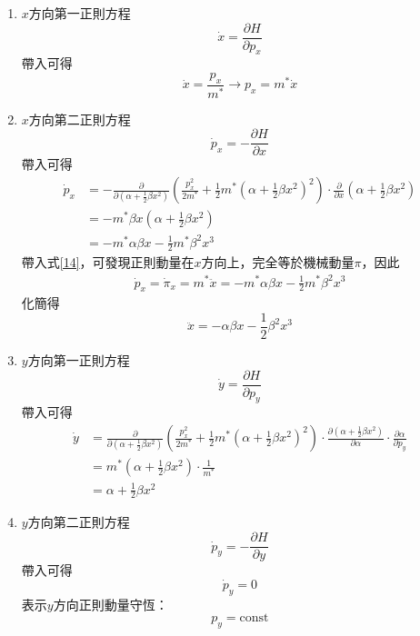 \documentclass[12pt]{article}
\begin{document}
\begin{enumerate}
    \item $x$方向第一正則方程
\begin{equation*}
    \dot{x}=\frac{\partial H}{\partial p_x}
\end{equation*}
帶入可得
\begin{equation}
    \dot{x}=\frac{p_x}{m^*}\to p_x=m^*\dot{x}\label{14}
\end{equation}
    \item $x$方向第二正則方程
\begin{equation*}
    \dot{p}_x=-\frac{\partial H}{\partial x}
\end{equation*}
帶入可得
\begin{align}
    \dot{p}_x
    &=-\frac{\partial}{\partial (\alpha+\frac12\beta x^2)}\left(\frac{p_x^2}{2m^*}+\frac{1}{2}m^*\left(\alpha+\frac12\beta x^2\right)^2\right)\cdot\frac{\partial}{\partial x}\left(\alpha+\frac12\beta x^2\right) \nonumber \\
    &=-m^*\beta x\left(\alpha+\frac12\beta x^2\right) \nonumber \\
    &=-m^*\alpha\beta x-\frac12m^*\beta^2x^3
\end{align}
帶入式\eqref{14}，可發現正則動量在$x$方向上，完全等於機械動量$\pi$，因此
\begin{align}
    \dot{p}_x=\dot{\pi}_x=m^*\ddot{x}=-m^*\alpha\beta x-\frac12m^*\beta^2x^3
\end{align}
化簡得
\begin{equation}
    \ddot{x}=-\alpha\beta x-\frac12\beta^2x^3\label{17}
\end{equation}
    \item $y$方向第一正則方程
\begin{equation*}
    \dot{y}=\frac{\partial H}{\partial p_y}
\end{equation*}
帶入可得
\begin{align}
    \dot{y}&=\frac{\partial}{\partial (\alpha+\frac12\beta x^2)}\left(\frac{p_x^2}{2m^*}+\frac{1}{2}m^*\left(\alpha+\frac12\beta x^2\right)^2\right)\cdot\frac{\partial (\alpha+\frac12\beta x^2)}{\partial\alpha}\cdot\frac{\partial\alpha}{\partial p_y}\nonumber\\
    &=m^*\left(\alpha+\frac12\beta x^2\right)\cdot\frac{1}{m^*}\nonumber\\
    &=\alpha+\frac12\beta x^2\label{18}
\end{align}
    \item $y$方向第二正則方程
\begin{equation*}
    \dot{p}_y=-\frac{\partial H}{\partial y}
\end{equation*}
帶入可得
\begin{equation}
    \dot{p}_y=0
\end{equation}
表示$y$方向正則動量守恆：\[p_y=\text{const}\]
\end{enumerate}
\end{document}
